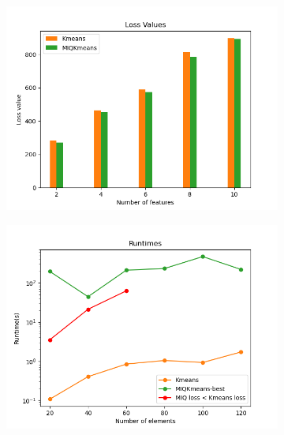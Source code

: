 \documentclass{article}
\begin{document}
\begin{figure}[h]
\begin{subfigure}{0.32\linewidth}
         \includegraphics[width=\linewidth]{../results/log_plots/loss_features_sint2}
     \end{subfigure}
     \begin{subfigure}{0.32\linewidth}
         \includegraphics[width=\linewidth]{../results/log_plots/runtime_size_sint2_log}
     \end{subfigure}%
     \begin{subfigure}{0.32\linewidth}

\end{subfigure}
\end{figure}
\end{document}
